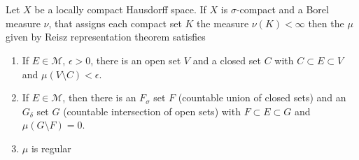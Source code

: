 
\chapter{}

\begin{theorem}
  Let $X$ be a locally compact Hausdorff space. If $X$ is
  $\sigma$-compact and a Borel measure $\nu$, that assigns each
  compact set $K$ the measure $\nu(K) < \infty$ then the $\mu$ given
  by Reisz representation theorem satisfies
  \begin{enumerate}
    \item If $E \in \mathcal{M}$, $\epsilon > 0$, there is an open
      set $V$ and a closed set $C$ with $C \subset E \subset V$ and
      $\mu(V\setminus C) < \epsilon$.
    \item If $E \in \mathcal{M}$, then there is an $F_\sigma$ set $F$
      (countable union of closed sets) and  an $G_\delta$ set $G$
      (countable intersection of open sets) with $F \subset E \subset
      G$ and $\mu(G \setminus F) = 0$.
    \item $\mu$ is regular
  \end{enumerate}
\end{theorem}
